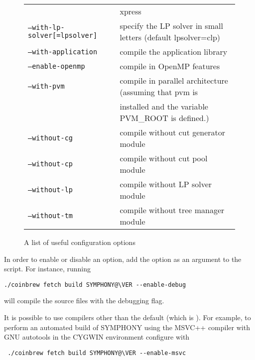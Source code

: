 \begin{figure}[htb]
\begin{tabular}{ll}
& xpress \\
\texttt{--with-lp-solver[=lpsolver]} &  specify the LP solver in small 
letters (default lpsolver=clp) \\
\texttt{--with-application} &  compile the application library \\
\hline
\texttt{--enable-openmp} &   compile in OpenMP features \\
\texttt{--with-pvm } &  compile in parallel architecture (assuming that pvm is \\ 
&installed and the variable PVM\_ROOT is defined.) \\
\texttt{--without-cg} &  compile without cut generator module \\
\texttt{--without-cp} &  compile without cut pool module \\
\texttt{--without-lp} &  compile without LP solver module \\
\texttt{--without-tm} &  compile without tree manager module
\end{tabular}
\caption{A list of useful configuration options \label{conf_opts}}
\end{figure}

In order to enable or disable an option, add the option as an argument to the
 script. For instance, running 
{\color{brown}
\begin{verbatim}
./coinbrew fetch build SYMPHONY@\VER --enable-debug
\end{verbatim}
}
will compile the source files with the debugging flag.

It is possible to use compilers other than the default (which is ).
For example, to perform an automated build of SYMPHONY using the MSVC++
compiler  with GNU autotools in the CYGWIN environment configure with
{\color{brown}
\begin{verbatim}
 ./coinbrew fetch build SYMPHONY@\VER --enable-msvc
\end{verbatim}
}

